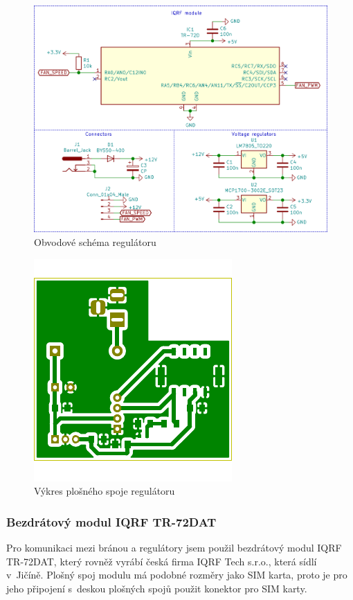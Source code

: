 \documentclass[12pt,a4paper]{article}
\begin{document}
\begin{figure}[H]
\centering
\label{fig:schematic/fan-regulator}
\includegraphics[width = 128mm]{img/kicad/fan-regulator-schema.png}
\caption{Obvodové schéma regulátoru}
\end{figure}

\begin{figure}[H]
\centering
\label{fig:board/fan-regulator}
\includegraphics{img/kicad/fan-regulator-board.pdf}
\caption{Výkres plošného spoje regulátoru}
\end{figure}

\subsubsection{Bezdrátový modul IQRF TR-72DAT}

Pro komunikaci mezi bránou a regulátory jsem použil bezdrátový modul IQRF TR-72DAT, který rovněž vyrábí česká firma IQRF Tech s.r.o., která sídlí v~Jičíně. Plošný spoj modulu má podobné rozměry jako SIM karta, proto je pro jeho připojení s~deskou plošných spojů použit konektor pro SIM karty.
\end{document}

